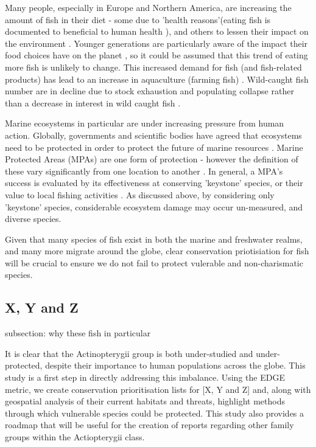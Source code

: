 \documentclass[11pt]{article}
\begin{document}
Many people, especially in Europe and Northern 
America, are increasing the amount of fish in their diet - some due to 'health 
reasons'(eating fish is documented to beneficial to human health 
\autocite{Rimm2006}), and others to 
lessen their impact on the environment \autocite{Mary2020}. Younger generations 
are particularly aware of the impact their food choices have on the planet 
\autocite{Mary2020}, so it could be assumed that this trend of eating more fish 
is unlikely to change. This increased demand for fish (and fish-related 
products) has lead to an increase in aquaculture (farming fish) 
\autocite{Belton2018}. Wild-caught 
fish number are in decline due to stock exhaustion and 
populating collapse rather than a decrease in interest in wild caught fish 
\autocite{Tremblay2011, Belton2018}. 

Marine ecosystems in particular are under increasing pressure from human 
action. Globally, governments and scientific bodies have agreed that ecosystems 
need to be protected in order to protect the future of marine resources 
\autocite{MurakiGottlieb2018}. Marine Protected Areas (MPAs) are one form of 
protection - 
however the definition of these vary significantly from one location to 
another \autocite{Marinesque2012}. In general,  a MPA's success is evaluated by 
its effectiveness at conserving 'keystone' species, or their value to local 
fishing activities \autocite{Marinesque2012}. As discussed above, by 
considering only 'keystone' species, considerable ecosystem damage may occur 
un-measured, and diverse species. 

Given that many species of fish 
exist in both the marine and freshwater realms, and many more migrate around 
the globe, clear conservation priotisiation for fish will be crucial to ensure 
we do not fail to protect vulerable and non-charismatic species. 


\subsection{X, Y  and Z}
subsection: why these fish in particular



It is clear that the Actinopterygii group is both under-studied and 
under-protected, despite their importance to human populations across the 
globe. This study is a first step in directly addressing this imbalance. Using 
the EDGE metric, we create conservation prioritisation lists for [X, Y and Z] 
and, along with geospatial analysis of their current habitats and threats, 
highlight methods through which vulnerable species could be protected. This 
study also provides a roadmap that will be useful for the creation of reports 
regarding other family groups within the Actiopterygii class.  
\end{document}
